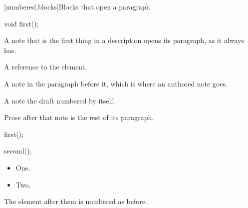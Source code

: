 [numbered.blocks]{Blocks that open a paragraph}

\begin{itemdecl}
void first();
\end{itemdecl}

\begin{itemdescr}
\pnum
\begin{note}
A note that is the first thing in a description opens its paragraph, as it always has.
\end{note}

\pnum
\returns
A reference to the element.
\begin{note}
A note in the paragraph before it, which is where an authored note goes.
\end{note}

\pnum
\begin{note}
A note the draft numbered by itself.
\end{note}
Prose after that note is the rest of its paragraph.

\pnum
\begin{example}
\begin{codeblock}
first();
\end{codeblock}
\end{example}

\pnum
\begin{codeblock}
second();
\end{codeblock}

\pnum
\begin{itemize}
\item One.
\item Two.
\end{itemize}

\pnum
\remarks
The element after them is numbered as before.
\end{itemdescr}

